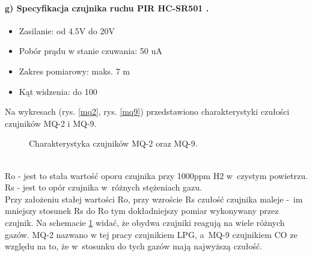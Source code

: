 \documentclass[polish,bachelor,a4paper,oneside]{ppfcmthesis}
\begin{document}
    \paragraph{g) Specyfikacja czujnika ruchu PIR HC-SR501 \protect\cite{pir}.}
    \begin{itemize}
        \item Zasilanie: od 4.5V do 20V
        \item Pobór prądu w stanie czuwania: 50 uA
        \item Zakres pomiarowy: maks. 7 m
        \item Kąt widzenia: do 100\textdegree{}
    \end{itemize}
    Na wykresach (rys. \ref{mq2}, rys. \ref{mq9}) przedstawiono charakterystyki czułości czujników MQ-2 i MQ-9.
    \begin{figure}[ht]
        \centering
        \hfill
        \caption{Charakterystyka czujników MQ-2 oraz MQ-9.}
        \label{mq2_mq9}
    \end{figure}
    \\Ro - jest to stała wartość oporu czujnika przy 1000ppm H2 w~czystym powietrzu.\\
    Rs - jest to opór czujnika w~różnych stężeniach gazu. \\
    Przy założeniu stałej wartości Ro, przy wzroście Rs czułość czujnika maleje -~im mniejszy stosunek Rs do Ro tym dokładniejszy pomiar wykonywany przez czujnik. Na schemacie \ref{mq2_mq9} widać, że obydwa czujniki reagują na wiele różnych gazów. MQ-2 nazwano w tej pracy czujnikiem LPG, a~MQ-9 czujnikiem CO ze względu na to, że w~stosunku do tych gazów mają najwyższą czułość.
\end{document}

